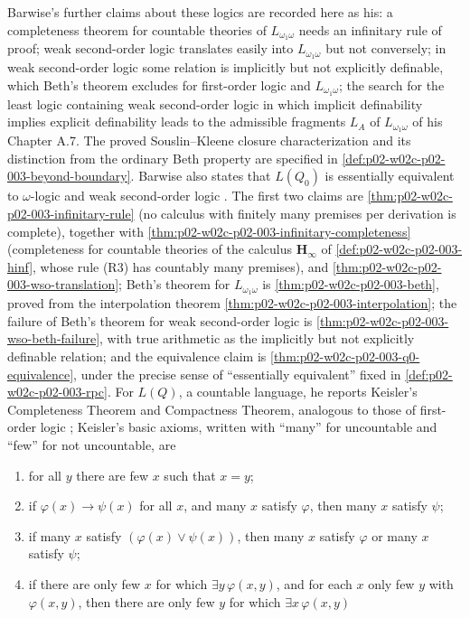 Barwise's further claims about these logics are recorded here as his:
a completeness theorem for countable theories of \(L_{\omega_1\omega}\)
needs an infinitary rule of proof; weak second-order logic translates
easily into \(L_{\omega_1\omega}\) but not conversely; in weak second-order
logic some relation is implicitly but not explicitly definable, which
Beth's theorem excludes for first-order logic and \(L_{\omega_1\omega}\);
the search for the least logic containing weak second-order logic in which
implicit definability implies explicit definability leads to the admissible
fragments \(L_A\) of \(L_{\omega_1\omega}\) of his Chapter A.7.
The proved Souslin--Kleene closure characterization and its distinction
from the ordinary Beth property are specified in
\cref{def:p02-w02c-p02-003-beyond-boundary}. Barwise also states that
\(L(Q_0)\) is essentially equivalent to \(\omega\)-logic and weak
second-order logic \cite[ch.~A.1, \S5, p.~44]{Barwise1977FirstOrder}.  The
first two claims are \cref{thm:p02-w02c-p02-003-infinitary-rule} (no
calculus with finitely many premises per derivation is complete),
together with \cref{thm:p02-w02c-p02-003-infinitary-completeness}
(completeness for countable theories of the calculus
\(\mathbf H_{\infty}\) of \cref{def:p02-w02c-p02-003-hinf}, whose rule
(R3) has countably many premises), and
\cref{thm:p02-w02c-p02-003-wso-translation}; Beth's theorem for
\(L_{\omega_1\omega}\) is \cref{thm:p02-w02c-p02-003-beth}, proved from the
interpolation theorem \cref{thm:p02-w02c-p02-003-interpolation}; the failure
of Beth's theorem for weak second-order logic is
\cref{thm:p02-w02c-p02-003-wso-beth-failure}, with true arithmetic as the
implicitly but not explicitly definable relation; and the equivalence
claim is \cref{thm:p02-w02c-p02-003-q0-equivalence}, under the precise
sense of ``essentially equivalent'' fixed in
\cref{def:p02-w02c-p02-003-rpc}.  For
\(L(Q)\), a countable language, he reports Keisler's Completeness Theorem
and Compactness Theorem, analogous to those of first-order logic
\cite{Keisler1970}; Keisler's basic axioms, written with ``many'' for
uncountable and ``few'' for not uncountable, are
\begin{enumerate}
\item for all \(y\) there are few \(x\) such that \(x=y\);
\item if \(\varphi(x)\to\psi(x)\) for all \(x\), and many \(x\) satisfy
      \(\varphi\), then many \(x\) satisfy \(\psi\);
\item if many \(x\) satisfy \((\varphi(x)\lor\psi(x))\), then many \(x\)
      satisfy \(\varphi\) or many \(x\) satisfy \(\psi\);
\item if there are only few \(x\) for which \(\exists y\,\varphi(x,y)\), and
      for each \(x\) only few \(y\) with \(\varphi(x,y)\), then there are only
      few \(y\) for which \(\exists x\,\varphi(x,y)\)
\end{enumerate}
